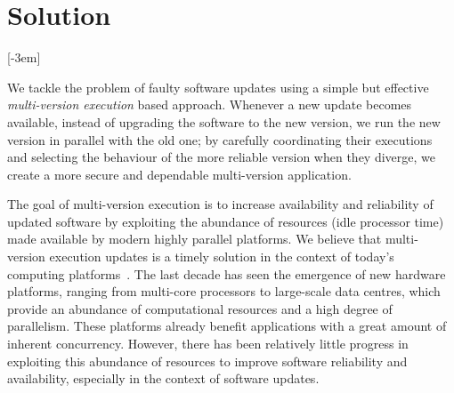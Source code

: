 \section{Solution}[-3em]
\label{overview:solution}

We tackle the problem of faulty software updates using a simple but effective
\emph{multi-version execution} based approach. Whenever a new update becomes
available, instead of upgrading the software to the new version, we run the new
version in parallel with the old one; by carefully coordinating their
executions and selecting the behaviour of the more reliable version when they
diverge, we create a more secure and dependable multi-version application.


The goal of multi-version execution is to increase availability and reliability
of updated software by exploiting the abundance of resources (\eg idle
processor time) made available by modern highly parallel platforms.  We believe
that multi-version execution updates is a timely solution in the context of
today's computing platforms~\cite{multiplicity}. The last decade has seen the
emergence of new hardware platforms, ranging from multi-core processors to
large-scale data centres, which provide an abundance of computational resources
and a high degree of parallelism. These platforms already benefit applications
with a great amount of inherent concurrency.  However, there has been
relatively little progress in exploiting this abundance of resources to improve
software reliability and availability, especially in the context of software
updates.

